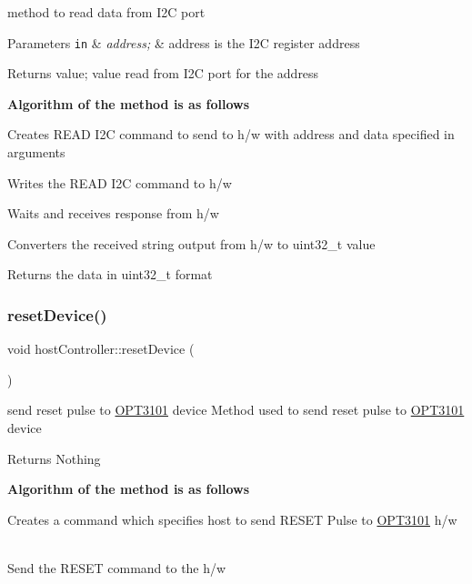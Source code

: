 method to read data from I2C port 


\begin{DoxyParams}[1]{Parameters}
\mbox{\tt in}  & {\em address;} & address is the I2C register address \\
\hline
\end{DoxyParams}
\begin{DoxyReturn}{Returns}
value; value read from I2C port for the address 
\end{DoxyReturn}
{\bfseries Algorithm of the method is as follows}


\begin{DoxyItemize}
\item Creates R\+E\+AD I2C command to send to h/w with address and data specified in arguments
\item Writes the R\+E\+AD I2C command to h/w
\item Waits and receives response from h/w
\item Converters the received string output from h/w to uint32\+\_\+t value
\item Returns the data in uint32\+\_\+t format 
\end{DoxyItemize}\mbox{\label{classhost_controller_aa9f25eaf4a9bda5213c70ff91c261649}} 
\subsubsection{\texorpdfstring{reset\+Device()}{resetDevice()}}
{\footnotesize\ttfamily void host\+Controller\+::reset\+Device (\begin{DoxyParamCaption}{ }\end{DoxyParamCaption})}



send reset pulse to \mbox{\hyperlink{namespace_o_p_t3101}{O\+P\+T3101}} device Method used to send reset pulse to \mbox{\hyperlink{namespace_o_p_t3101}{O\+P\+T3101}} device 

\begin{DoxyReturn}{Returns}
Nothing 
\end{DoxyReturn}
{\bfseries Algorithm of the method is as follows}


\begin{DoxyItemize}
\item Creates a command which specifies host to send R\+E\+S\+ET Pulse to \mbox{\hyperlink{namespace_o_p_t3101}{O\+P\+T3101}} h/w ~\newline

\item Send the R\+E\+S\+ET command to the h/w 
\end{DoxyItemize}\mbox{\label{classhost_controller_a024c031559fade5da0ff7de491212dfe}} 
